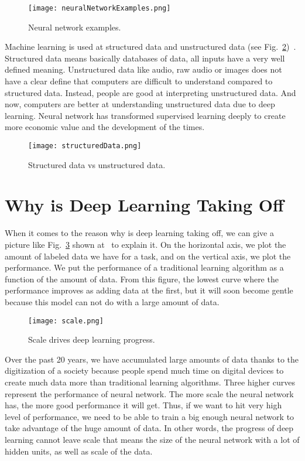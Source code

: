\documentclass[a4paper]{article}
\begin{document}
\begin{figure}[hb]
\begin{center}
\texttt{[image: neuralNetworkExamples.png]}
\end{center}
\caption{Neural network examples.}
\label{fig1}
\end{figure}

Machine learning is used at structured data and unstructured data (see Fig.~\ref{fig2})~\cite{Neural}. Structured data means basically databases of data, all inputs have a very well defined meaning. Unstructured data like audio, raw audio or images does not have a clear define that computers are difficult to understand compared to structured data. Instead, people are good at interpreting unstructured data. And now, computers are better at understanding unstructured data due to deep learning. Neural network has transformed supervised learning deeply to create more economic value and the development of the times.

\begin{figure}[hb]
\begin{center}
\texttt{[image: structuredData.png]}
\end{center}
\caption{Structured data vs unstructured data.}
\label{fig2}
\end{figure}

\section{Why is Deep Learning Taking Off}

When it comes to the reason why is deep learning taking off, we can give a picture like Fig.~\ref{fig3} shown at~\cite{Neural} to explain it. On the horizontal axis, we plot the amount of labeled data we have for a task, and on the vertical axis, we plot the performance. We put the performance of a traditional learning algorithm as a function of the amount of data. From this figure, the lowest curve where the performance improves as adding data at the first, but it will soon become gentle because this model can not do with a large amount of data. 

\begin{figure}
\begin{center}
\texttt{[image: scale.png]}
\end{center}
\caption{Scale drives deep learning progress.}
\label{fig3}
\end{figure}

Over the past 20 years, we have accumulated large amounts of data thanks to the digitization of a society because people spend much time on digital devices to create much data more than traditional learning algorithms. Three higher curves represent the performance of neural network. The more scale the neural network has, the more good performance it will get. Thus, if we want to hit very high level of performance, we need to be able to train a big enough neural network to take advantage of the huge amount of data. In other words, the progress of deep learning cannot leave scale that means the size of the neural network with a lot of hidden units, as well as scale of the data.
\end{document}
